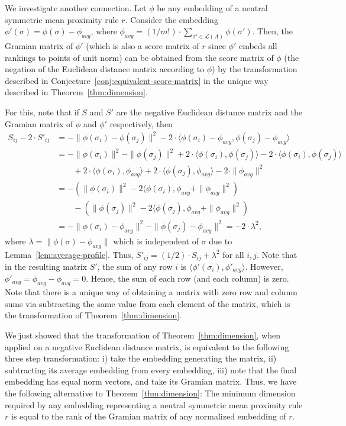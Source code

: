\documentclass[10pt,letterpaper]{article}
\newcommand{\calL}{{\mathcal{L}}}
\newcommand{\rank}{{\calL(A)}}
\begin{document}
We investigate another connection. Let $\phi$ be any embedding of a neutral symmetric mean proximity rule $r$. Consider the embedding $\phi'(\sigma) = \phi(\sigma)-\phi_{avg}$, where $\phi_{avg} = (1/m!) \cdot \sum_{\sigma' \in \rank} \phi(\sigma')$. Then, the Gramian matrix of $\phi'$ (which is also a score matrix of $r$ since $\phi'$ embeds all rankings to points of unit norm) can be obtained from the score matrix of $\phi$ (the negation of the Euclidean distance matrix according to $\phi$) by the transformation described in Conjecture~\ref{conj:equivalent-score-matrix} in the unique way described in Theorem~\ref{thm:dimension}. 

For this, note that if $S$ and $S'$ are the negative Euclidean distance matrix and the Gramian matrix of $\phi$ and $\phi'$ respectively, then 
\begin{align*}
S_{ij} - 2 \cdot S'_{ij} &= -\|\phi(\sigma_i)-\phi(\sigma_j)\|^2 - 2 \cdot \langle \phi(\sigma_i)-\phi_{avg}, \phi(\sigma_j)-\phi_{avg}\rangle \\
&= -\|\phi(\sigma_i)\|^2 -\|\phi(\sigma_j)\|^2 + 2 \cdot \langle \phi(\sigma_i),\phi(\sigma_j) \rangle - 2 \cdot \langle \phi(\sigma_i),\phi(\sigma_j) \rangle \\
&\quad\quad + 2 \cdot \langle \phi(\sigma_i),\phi_{avg} \rangle + 2 \cdot \langle \phi(\sigma_j),\phi_{avg} \rangle - 2 \cdot \|\phi_{avg}\|^2 \\
&= -\left(\|\phi(\sigma_i)\|^2 - 2 \langle \phi(\sigma_i),\phi_{avg} + \|\phi_{avg}\|^2  \right)  \\
&\quad\quad - \left(\|\phi(\sigma_j)\|^2 - 2 \langle \phi(\sigma_j),\phi_{avg} + \|\phi_{avg}\|^2  \right) \\
&= - \|\phi(\sigma_i)-\phi_{avg}\|^2 - \|\phi(\sigma_j)-\phi_{avg}\|^2 = -2\cdot \lambda^2,
\end{align*}
where $\lambda = \|\phi(\sigma)-\phi_{avg}\|$ which is independent of $\sigma$ due to Lemma~\ref{lem:average-profile}. Thus, $S'_{ij} = (1/2) \cdot S_{ij} + \lambda^2$ for all $i,j$. Note that in the resulting matrix $S'$, the sum of any row $i$ is $\langle \phi'(\sigma_i),\phi'_{avg} \rangle$. However, $\phi'_{avg} = \phi_{avg}-\phi_{avg} = 0$. Hence, the sum of each row (and each column) is zero. Note that there is a unique way of obtaining a matrix with zero row and column sums via subtracting the same value from each element of the matrix, which is the transformation of Theorem~\ref{thm:dimension}. 

We just showed that the transformation of Theorem~\ref{thm:dimension}, when applied on a negative Euclidean distance matrix, is equivalent to the following three step transformation: i) take the embedding generating the matrix, ii) subtracting its average embedding from every embedding, iii) note that the final embedding has equal norm vectors, and take its Gramian matrix. Thus, we have the following alternative to Theorem~\ref{thm:dimension}: The minimum dimension required by any embedding representing a neutral symmetric mean proximity rule $r$ is equal to the rank of the Gramian matrix of any normalized embedding of $r$. 
\end{document}
